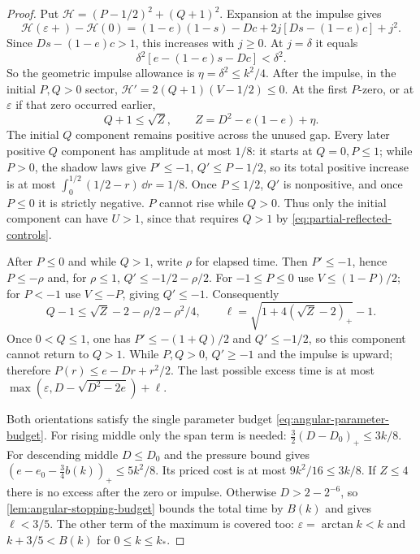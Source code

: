 \begin{proof}
Put $\mathcal H=(P-1/2)^2+(Q+1)^2$.
Expansion at the impulse gives
\[
 \mathcal H(\varepsilon+)-\mathcal H(0)
 =(1-e)(1-s)-Dc+2j[Ds-(1-e)c]+j^2.
\]
Since $Ds-(1-e)c>1$, this increases with $j\ge0$.
At $j=\delta$ it equals
\begin{equation}\label{eq:partial-impulse-energy}
 \delta^2[e-(1-e)s-Dc]<\delta^2.
\end{equation}
So the geometric impulse allowance is $\eta=\delta^2\le k^2/4$.
After the impulse, in the initial $P,Q>0$ sector,
$\mathcal H'=2(Q+1)(V-1/2)\le0$.
At the first $P$-zero, or at $\varepsilon$ if that zero occurred earlier,
\[
 Q+1\le\sqrt Z,\qquad Z=D^2-e(1-e)+\eta.
\]
The initial $Q$ component remains positive across the unused gap.
Every later positive $Q$ component has amplitude at most $1/8$:
it starts at $Q=0,P\le1$; while $P>0$, the shadow laws give
$P'\le-1$, $Q'\le P-1/2$, so its total positive increase is
at most $\int_0^{1/2}(1/2-r)\,\dd r=1/8$.
Once $P\le1/2$, $Q'$ is nonpositive, and once $P\le0$ it is
strictly negative. $P$ cannot rise while $Q>0$.
Thus only the initial component can have $U>1$, since that
requires $Q>1$ by \eqref{eq:partial-reflected-controls}.

After $P\le0$ and while $Q>1$, write $\rho$ for elapsed time.
Then $P'\le-1$, hence $P\le-\rho$ and, for $\rho\le1$,
$Q'\le-1/2-\rho/2$. For $-1\le P\le0$ use
$V\le(1-P)/2$; for $P<-1$ use $V\le-P$, giving $Q'\le-1$.
Consequently
\begin{equation}\label{eq:partial-excess-decay}
 Q-1\le\sqrt Z-2-\rho/2-\rho^2/4,\qquad
 \ell=\sqrt{1+4(\sqrt Z-2)_+}-1.
\end{equation}
Once $0<Q\le1$, one has $P'\le-(1+Q)/2$ and $Q'\le-1/2$,
so this component cannot return to $Q>1$.
While $P,Q>0$, $Q'\ge-1$ and the impulse is upward;
therefore $P(r)\le e-Dr+r^2/2$.
The last possible excess time is at most
$\max(\varepsilon,D-\sqrt{D^2-2e})+\ell$.

Both orientations satisfy the single parameter budget
\eqref{eq:angular-parameter-budget}.
For rising middle only the span term is needed:
$\tfrac32(D-D_0)_+\le3 k/8$.
For descending middle $D\le D_0$ and the pressure bound gives
$(e-e_0-\tfrac34b( k))_+\le5 k^2/8$.
Its priced cost is at most $9 k^2/16\le3 k/8$.
If $Z\le4$ there is no excess after the zero or impulse.
Otherwise $D>2-2^{-6}$, so \cref{lem:angular-stopping-budget}
bounds the total time by $B( k)$ and gives $\ell<3/5$.
The other term of the maximum is covered too:
$\varepsilon=\arctan k< k$ and
$ k+3/5<B( k)$ for $0\le k\le k_*$.


\end{proof}
